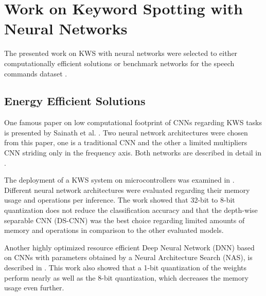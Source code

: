 
\section{Work on Keyword Spotting with Neural Networks}\label{sec:prev_kws}
The presented work on KWS with neural networks were selected to either computationally efficient solutions or benchmark networks for the speech commands dataset \cite{Warden2018}.



\subsection{Energy Efficient Solutions}
One famous paper on low computational footprint of CNNs regarding KWS tasks is presented by Sainath et al. \cite{Sainath2015}.
Two neural network architectures were chosen from this paper, one is a traditional CNN and the other a limited multipliers CNN striding only in the frequency axis.
Both networks are described in detail in .

The deployment of a KWS system on microcontrollers was examined in \cite{Zhang2017}.
Different neural network architectures were evaluated regarding their memory usage and operations per inference.
The work showed that 32-bit to 8-bit quantization does not reduce the classification accuracy and that the depth-wise separable CNN (DS-CNN) was the best choice regarding limited amounts of memory and operations in comparison to the other evaluated models.

Another highly optimized resource efficient Deep Neural Network (DNN) based on CNNs with parameters obtained by a Neural Architecture Search (NAS), is described in \cite{Peter2020}.
This work also showed that a 1-bit quantization of the weights perform nearly as well as the 8-bit quantization, which decreases the memory usage even further.



